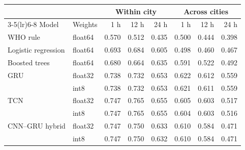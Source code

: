 \begin{tabular}{llrrrrrr}
\toprule
 & & \multicolumn{3}{c}{Within city} & \multicolumn{3}{c}{Across cities} \\
\cmidrule(lr){3-5}\cmidrule(lr){6-8}
Model & Weights & 1 h & 12 h & 24 h & 1 h & 12 h & 24 h \\
\midrule
WHO rule & float64 & 0.570 & 0.512 & 0.435 & 0.500 & 0.444 & 0.398 \\
Logistic regression & float64 & 0.693 & 0.684 & 0.605 & 0.498 & 0.460 & 0.467 \\
Boosted trees & float64 & 0.680 & 0.664 & 0.635 & 0.591 & 0.522 & 0.492 \\
GRU & float32 & 0.738 & 0.732 & 0.653 & 0.622 & 0.612 & 0.559 \\
 & int8 & 0.738 & 0.732 & 0.653 & 0.621 & 0.611 & 0.559 \\
TCN & float32 & 0.747 & 0.765 & 0.655 & 0.605 & 0.603 & 0.517 \\
 & int8 & 0.747 & 0.765 & 0.655 & 0.604 & 0.603 & 0.516 \\
CNN--GRU hybrid & float32 & 0.747 & 0.750 & 0.633 & 0.610 & 0.584 & 0.471 \\
 & int8 & 0.747 & 0.750 & 0.632 & 0.610 & 0.584 & 0.471 \\
\bottomrule
\end{tabular}